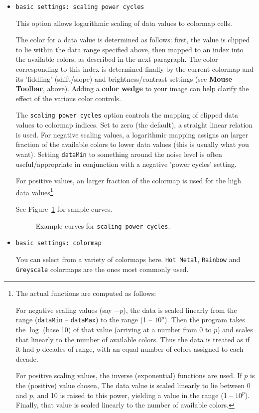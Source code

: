 \begin{itemize}
\item {\tt basic settings: scaling power cycles}

This option allows logarithmic scaling of data values to colormap cells.  

The color for a data value is determined as follows: first, the value
is clipped to lie within the data range specified above, then mapped
to an index into the available colors, as described in the next
paragraph. The color corresponding to this index is determined finally
by the current colormap and its 'fiddling' (shift/slope) and
brightness/contrast settings (see {\bf Mouse Toolbar}, above).  Adding
a {\bf color wedge} to your image can help clarify the effect of the
various color controls.

The {\tt scaling power cycles} option controls the mapping of clipped data
values to colormap indices.  Set to zero (the default), a straight linear
relation is used.  For negative scaling values, a logarithmic mapping
assigns an larger fraction of the available colors to lower data values (this
is usually what you want). Setting {\tt dataMin} 
to something around the noise level
is often useful/appropriate in conjunction with a negative 'power cycles'
setting. 

For positive values, an larger fraction of the colormap is used for the high
data values\footnote{The actual functions are computed as follows:

For negative scaling values (say $-p$), the data is scaled linearly
from the range ({\tt dataMin} -- {\tt dataMax}) to the range (1 -- $10^{p}$).
Then the program takes the $\log$ (base 10) of that value (arriving at
a number from 0 to $p$) and scales that linearly to the number of
available colors.  Thus the data is treated as if it had $p$ decades
of range, with an equal number of colors assigned to each decade.

For positive scaling values, the inverse (exponential) functions are used.
If $p$ is the (positive) value chosen,  The data value is scaled linearly to
lie between 0 and $p$, and 10 is raised to this power, yielding a value in the
range (1 -- $10^{p}$).  Finally, that value is scaled linearly to the number
of available colors.}.

See Figure~\ref{fig:scalingpower} for sample curves.
\begin{figure}[h]
\begin{center}
\caption{\label{fig:scalingpower} Example curves for {\tt scaling power cycles}.}
\hrulefill
\end{center}
\end{figure}

\item {\tt basic settings: colormap}

You can select from a variety of colormaps here.  {\tt Hot Metal},
{\tt Rainbow} and {\tt Greyscale} colormaps are the ones most commonly used.

\end{itemize}


